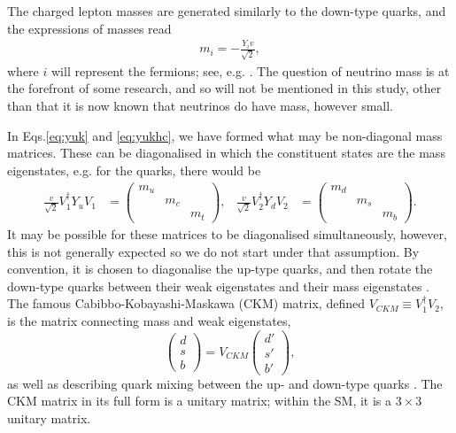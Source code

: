 \documentclass[a4paper,12pt]{article}
\begin{document}
The charged lepton masses are generated similarly to the down-type quarks, and the expressions of masses read
\begin{align}
    \label{eq:fermas}
    m_i = -\frac{Y_iv}{\sqrt{2}},
\end{align}
where $i$ will represent the fermions; see, e.g. \cite{schwartz}. 
The question of neutrino mass is at the forefront of some research, and so will not be mentioned in this study, other than that it is now known that neutrinos do have mass, however small. 

In Eqs.\eqref{eq:yuk} and \eqref{eq:yukhc}, we have formed what may be non-diagonal mass matrices. 
These can be diagonalised in which the constituent states are the mass eigenstates, e.g. for the quarks, there would be 
\begin{align}
    \label{eq:massmat}
    \frac{v}{\sqrt{2}}V_1^\dagger Y_uV_1 &= \begin{pmatrix} m_u & & \\ & m_c & \\ & & m_t\end{pmatrix}, & \frac{v}{\sqrt{2}}V_2^\dagger Y_dV_2 &= \begin{pmatrix} m_d & & \\ & m_s & \\ & & m_b\end{pmatrix}.
\end{align}
It may be possible for these matrices to be diagonalised simultaneously, however, this is not generally expected so we do not start under that assumption. 
By convention, it is chosen to diagonalise the up-type quarks, and then rotate the down-type quarks between their weak eigenstates and their mass eigenstates \cite{dono}. 
The famous Cabibbo-Kobayashi-Maskawa (CKM) matrix, defined $V_{CKM}\equiv V_1^\dagger V_2$, is the matrix connecting mass and weak eigenstates,
\begin{equation}
    \label{eq:ckmone}
    \begin{pmatrix} d \\ s \\ b\end{pmatrix} = V_{CKM}\begin{pmatrix} d' \\ s' \\ b'\end{pmatrix},
\end{equation}
as well as describing quark mixing between the up- and down-type quarks \cite{kobamask}. 
The CKM matrix in its full form is a unitary matrix; within the SM, it is a $3\times3$ unitary matrix. 
\end{document}

